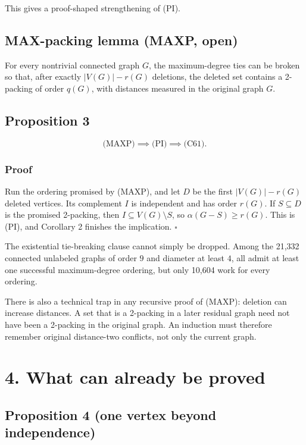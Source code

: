 \documentclass[
  11pt,
  letterpaper,
]{article}
\begin{document}
This gives a proof-shaped strengthening of (PI).

\subsection{MAX-packing lemma (MAXP,
open)}\label{max-packing-lemma-maxp-open}

For every nontrivial connected graph \(G\), the maximum-degree ties can
be broken so that, after exactly \(|V(G)|-r(G)\) deletions, the deleted
set contains a 2-packing of order \(q(G)\), with distances measured in
the original graph \(G\).

\subsection{Proposition 3}\label{proposition-3}

\[
\text{(MAXP)}\implies\text{(PI)}\implies\text{(C61)}.
\]

\subsubsection{Proof}\label{proof-2}

Run the ordering promised by (MAXP), and let \(D\) be the first
\(|V(G)|-r(G)\) deleted vertices. Its complement \(I\) is independent
and has order \(r(G)\). If \(S\subseteq D\) is the promised 2-packing,
then \(I\subseteq V(G)\setminus S\), so \(\alpha(G-S)\ge r(G)\). This is
(PI), and Corollary 2 finishes the implication. \(\square\)

The existential tie-breaking clause cannot simply be dropped. Among the
21,332 connected unlabeled graphs of order \(9\) and diameter at least
\(4\), all admit at least one successful maximum-degree ordering, but
only 10,604 work for every ordering.

There is also a technical trap in any recursive proof of (MAXP):
deletion can increase distances. A set that is a 2-packing in a later
residual graph need not have been a 2-packing in the original graph. An
induction must therefore remember original distance-two conflicts, not
only the current graph.

\section{4. What can already be
proved}\label{what-can-already-be-proved}

\subsection{Proposition 4 (one vertex beyond
independence)}\label{proposition-4-one-vertex-beyond-independence}
\end{document}
